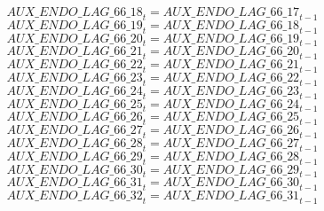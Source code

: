 \begin{dmath}
{AUX\_ENDO\_LAG\_66\_18}_{t}={AUX\_ENDO\_LAG\_66\_17}_{t-1}
\end{dmath}
\begin{dmath}
{AUX\_ENDO\_LAG\_66\_19}_{t}={AUX\_ENDO\_LAG\_66\_18}_{t-1}
\end{dmath}
\begin{dmath}
{AUX\_ENDO\_LAG\_66\_20}_{t}={AUX\_ENDO\_LAG\_66\_19}_{t-1}
\end{dmath}
\begin{dmath}
{AUX\_ENDO\_LAG\_66\_21}_{t}={AUX\_ENDO\_LAG\_66\_20}_{t-1}
\end{dmath}
\begin{dmath}
{AUX\_ENDO\_LAG\_66\_22}_{t}={AUX\_ENDO\_LAG\_66\_21}_{t-1}
\end{dmath}
\begin{dmath}
{AUX\_ENDO\_LAG\_66\_23}_{t}={AUX\_ENDO\_LAG\_66\_22}_{t-1}
\end{dmath}
\begin{dmath}
{AUX\_ENDO\_LAG\_66\_24}_{t}={AUX\_ENDO\_LAG\_66\_23}_{t-1}
\end{dmath}
\begin{dmath}
{AUX\_ENDO\_LAG\_66\_25}_{t}={AUX\_ENDO\_LAG\_66\_24}_{t-1}
\end{dmath}
\begin{dmath}
{AUX\_ENDO\_LAG\_66\_26}_{t}={AUX\_ENDO\_LAG\_66\_25}_{t-1}
\end{dmath}
\begin{dmath}
{AUX\_ENDO\_LAG\_66\_27}_{t}={AUX\_ENDO\_LAG\_66\_26}_{t-1}
\end{dmath}
\begin{dmath}
{AUX\_ENDO\_LAG\_66\_28}_{t}={AUX\_ENDO\_LAG\_66\_27}_{t-1}
\end{dmath}
\begin{dmath}
{AUX\_ENDO\_LAG\_66\_29}_{t}={AUX\_ENDO\_LAG\_66\_28}_{t-1}
\end{dmath}
\begin{dmath}
{AUX\_ENDO\_LAG\_66\_30}_{t}={AUX\_ENDO\_LAG\_66\_29}_{t-1}
\end{dmath}
\begin{dmath}
{AUX\_ENDO\_LAG\_66\_31}_{t}={AUX\_ENDO\_LAG\_66\_30}_{t-1}
\end{dmath}
\begin{dmath}
{AUX\_ENDO\_LAG\_66\_32}_{t}={AUX\_ENDO\_LAG\_66\_31}_{t-1}
\end{dmath}
